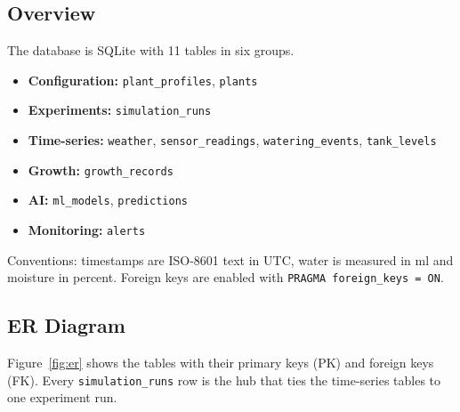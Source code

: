 \documentclass[11pt,a4paper]{article}
\newcommand{\cn}[1]{\texttt{#1}}   %
\begin{document}
\subsection{Overview}
The database is SQLite with 11 tables in six groups.
\begin{itemize}
  \item \textbf{Configuration:} \cn{plant\_profiles}, \cn{plants}
  \item \textbf{Experiments:} \cn{simulation\_runs}
  \item \textbf{Time-series:} \cn{weather}, \cn{sensor\_readings}, \cn{watering\_events}, \cn{tank\_levels}
  \item \textbf{Growth:} \cn{growth\_records}
  \item \textbf{AI:} \cn{ml\_models}, \cn{predictions}
  \item \textbf{Monitoring:} \cn{alerts}
\end{itemize}
Conventions: timestamps are ISO-8601 text in UTC, water is measured in ml and
moisture in percent. Foreign keys are enabled with \cn{PRAGMA foreign\_keys = ON}.

\subsection{ER Diagram}
Figure~\ref{fig:er} shows the tables with their primary keys (PK) and foreign
keys (FK). Every \cn{simulation\_runs} row is the hub that ties the time-series
tables to one experiment run.
\end{document}
